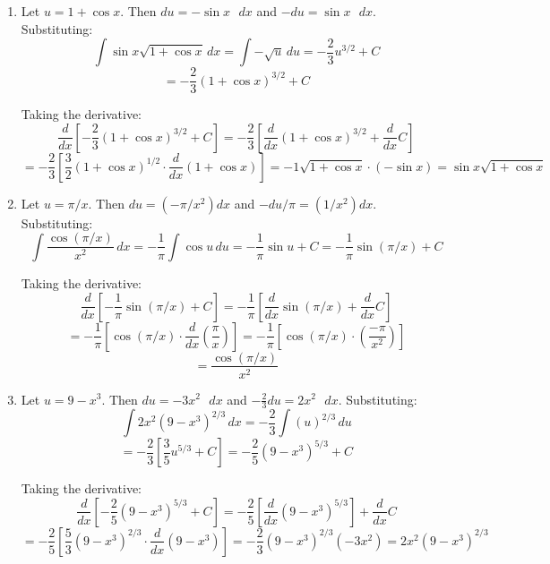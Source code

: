 \begin{Answer}[ref = u_indef]
\begin{enumerate}
    \item Let $u = 1 + \cos{x}$. Then $du = -\sin{x} \text{ } dx$ and $-du = 
    \sin{x} \text{ } dx$. Substituting:
    $$\int \sin{x} \sqrt{1 + \cos{x}}\,dx = \int -\sqrt{u}\,du = -\frac{2}{3} 
    u^{3/2} + C$$
    $$= -\frac{2}{3} \left( 1 + \cos{x} \right)^{3/2} + C$$

    Taking the derivative:
    $$\frac{d}{dx} \left[ -\frac{2}{3} \left( 1 + \cos{x} \right)^{3/2} + C 
    \right] = -\frac{2}{3} \left[ \frac{d}{dx} \left( 1 + \cos{x} 
    \right)^{3/2} + \frac{d}{dx}C \right]$$
    $$= -\frac{2}{3} \left[ \frac{3}{2} \left(1 + \cos{x} \right)^{1/2} \cdot 
    \frac{d}{dx} \left( 1 + \cos{x} \right) \right] = -1 \sqrt{1 + \cos{x}} 
    \cdot \left( - \sin{x} \right) = \sin{x} \sqrt{1 + \cos{x}}$$

    \item Let $u = \pi / x$. Then $du = (- \pi / x^2)dx$ and $-du / \pi = (1 / 
    x^2)dx$. Substituting:
    $$\int \frac{\cos{ \left( \pi / x \right)}}{x^2}\,dx = -\frac{1}{\pi} \int 
    \cos{u}\,du = -\frac{1}{\pi} \sin{u} + C = -\frac{1}{\pi} \sin{ \left( \pi 
    / x \right)} + C$$

    Taking the derivative:
    $$\frac{d}{dx} \left[ - \frac{1}{\pi} \sin{ \left( \pi / x \right)} + C 
    \right] = -\frac{1}{\pi} \left[ \frac{d}{dx} \sin{ \left( \pi / x \right)} 
    + \frac{d}{dx} C \right]$$
    $$= -\frac{1}{\pi} \left[ \cos{ \left( \pi / x \right)} \cdot \frac{d}{dx} 
    \left( \frac{\pi}{x} \right) \right] = -\frac{1}{\pi} \left[ \cos{ \left( 
    \pi / x \right)} \cdot \left( \frac{-\pi}{x^2} \right) \right]$$
    $$= \frac{\cos{ \left( \pi / x \right)}}{x^2}$$

    \item Let $u = 9 - x^3$. Then $du = -3x^2 \text{ } dx$ and $-\frac{2}{3}du 
    = 2x^2 \text{ } dx$. Substituting:
    $$\int 2x^2 \left( 9 - x^3 \right)^{2/3}\,dx = -\frac{2}{3} \int \left( u 
    \right)^{2/3}\,du$$
    $$= -\frac{2}{3} \left[ \frac{3}{5}u^{5/3} + C \right] = -\frac{2}{5} 
    \left( 9 - x^3 \right)^{5/3} + C$$

    Taking the derivative:
    $$\frac{d}{dx} \left[ -\frac{2}{5} \left( 9 - x^3 \right)^{5/3} + C 
    \right] = -\frac{2}{5} \left[ \frac{d}{dx} \left( 9 - x^3 \right)^{5/3} 
    \right]+ \frac{d}{dx}C$$
    $$= -\frac{2}{5} \left[ \frac{5}{3} \left( 9 - x^3 \right)^{2/3} \cdot 
    \frac{d}{dx} \left( 9 - x^3 \right) \right] = -\frac{2}{3} \left( 9 - x^3 
    \right)^{2/3} \left( -3x^2 \right) = 2x^2 \left( 9 - x^3 \right)^{2/3}$$


\end{enumerate}
\end{Answer}
